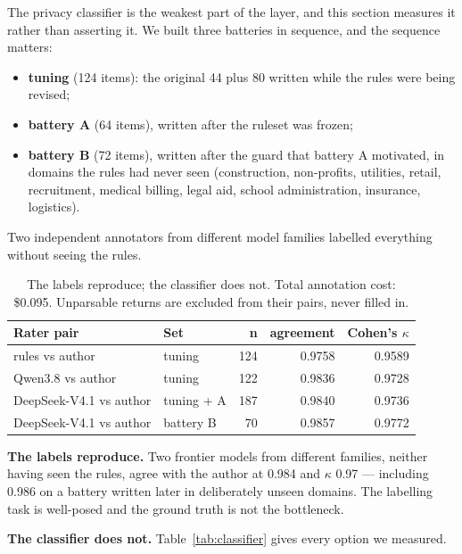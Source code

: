 \documentclass[11pt]{article}
\begin{document}
The privacy classifier is the weakest part of the layer, and this section measures it rather than
asserting it. We built three batteries in sequence, and the sequence matters:

\begin{itemize}
\item \textbf{tuning} (124 items): the original 44 plus 80 written while the rules were being revised;
\item \textbf{battery A} (64 items), written after the ruleset was frozen;
\item \textbf{battery B} (72 items), written after the guard that battery A motivated, in domains the
rules had never seen (construction, non-profits, utilities, retail, recruitment, medical billing,
legal aid, school administration, insurance, logistics).
\end{itemize}

Two independent annotators from different model families labelled everything without seeing the
rules.

\begin{table}[h]
\centering
\small
\begin{tabular}{@{}llrrr@{}}
\toprule
\textbf{Rater pair} & \textbf{Set} & \textbf{n} & \textbf{agreement} & \textbf{Cohen's $\kappa$} \\
\midrule
rules vs author            & tuning            & 124 & 0.9758 & 0.9589 \\
Qwen3.8 vs author          & tuning            & 122 & 0.9836 & 0.9728 \\
DeepSeek-V4.1 vs author    & tuning + A        & 187 & 0.9840 & 0.9736 \\
DeepSeek-V4.1 vs author    & battery B         &  70 & 0.9857 & 0.9772 \\
\bottomrule
\end{tabular}
\caption{The labels reproduce; the classifier does not. Total annotation cost: \$0.095. Unparsable
returns are excluded from their pairs, never filled in.}
\label{tab:annotator}
\end{table}

\textbf{The labels reproduce.} Two frontier models from different families, neither having seen the
rules, agree with the author at 0.984 and $\kappa$ 0.97 — including 0.986 on a battery written
later in deliberately unseen domains. The labelling task is well-posed and the ground truth is not the
bottleneck.

\textbf{The classifier does not.} Table~\ref{tab:classifier} gives every option we measured.
\end{document}
